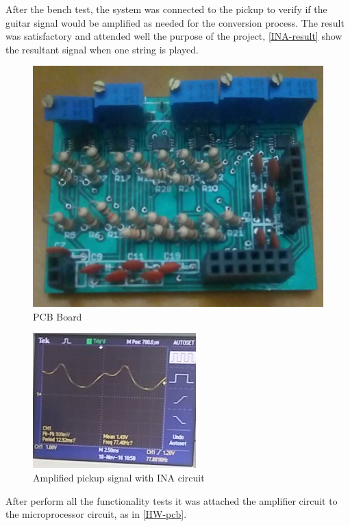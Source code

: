 After the bench test, the system was connected to the pickup to verify if the guitar signal would be
amplified as needed for the conversion process. The result was satisfactory and
attended well the purpose of the project, \autoref{INA-result} show
the resultant signal when one string is played.

\begin{figure}[!htpb]
  \centering
  \caption{PCB Board}
  \label{assembled-pcb}
  \includegraphics[scale=0.28]{images/INA/assembled-pcb.jpeg}
\end{figure}

\begin{figure}[!htpb]
\centering
\caption{Amplified pickup signal with INA circuit}
\label{INA-result}
\includegraphics[scale=.9]{images/INA/result}
\end{figure}

After perform all the functionality tests it was attached the amplifier circuit to the
microprocessor circuit, as in \autoref{HW-pcb}.

